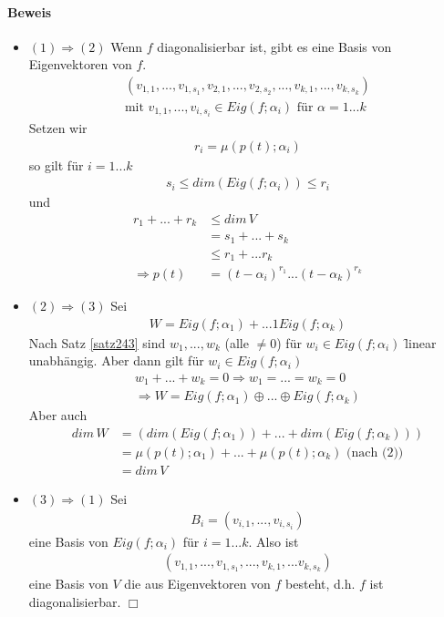 \paragraph{Beweis}
\begin{itemize}
\item $(1) \Rightarrow (2)$ Wenn $f$ diagonalisierbar ist, gibt es eine Basis von Eigenvektoren von $f$.
\begin{align}
(v_{1, 1}, ..., v_{1, s_1}, v_{2, 1}, ..., v_{2, s_2}, ..., v_{k, 1}, ..., v_{k, s_k}) \\
\text{mit } v_{1, 1}, ..., v_{i, s_i} \in Eig(f; \alpha_i) \text{ für } \alpha = 1...k
\end{align}
Setzen wir
\begin{align}
r_i = \mu(p(t); \alpha_i)
\end{align}
so gilt für $i=1...k$
\begin{align}
s_i \leq dim(Eig(f; \alpha_i)) \leq r_i
\end{align}
und 
\begin{align}
r_1 + ... + r_k &\leq dim\, V \\
&= s_1 + ...+ s_k \\
&\leq r_1 + ... r_k\\
\Rightarrow p(t) &= (t - \alpha_i)^{r_1}...(t-\alpha_k)^{r_k}
\end{align}

\item $(2) \Rightarrow (3)$ Sei
\begin{align}
W = Eig(f; \alpha_1) + ... 1 Eig(f; \alpha_k)
\end{align}
Nach Satz \ref{satz243} sind $w_1, ..., w_k$ (alle $\neq 0$) für $w_i \in Eig(f; \alpha_i)$ \f{linear unabhängig}. Aber dann gilt für $w_i \in Eig(f; \alpha_i)$
\begin{align}
w_1 + ... + w_k = 0 \Rightarrow w_1 = ... = w_k = 0 \\
\Rightarrow W = Eig(f; \alpha_1) \oplus  ... \oplus  Eig(f; \alpha_k)
\end{align}
Aber auch
\begin{align}
dim\, W &= (dim(Eig(f; \alpha_1)) + ... + dim(Eig(f; \alpha_k))) \\
&= \mu(p(t); \alpha_1) + ... + \mu(p(t); \alpha_k) \text{ (nach (2))}\\ 
&= dim\, V
\end{align}

\item $(3) \Rightarrow (1)$ Sei
\begin{align}
B_i = (v_{i, 1}, ..., v_{i, s_i})
\end{align}
eine Basis von $Eig(f; \alpha_i)$ für $i = 1...k$.
Also ist
\begin{align}
(v_{1,1}, ..., v_{1, s_1}, ..., v_{k, 1}, ... v_{k, s_k})
\end{align}
eine Basis von $V$ die aus Eigenvektoren von $f$ besteht, d.h. $f$ ist diagonalisierbar. \hfill $\Box$
\end{itemize}
